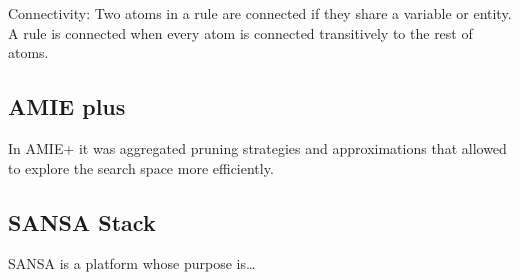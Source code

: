 \documentclass{article}
\begin{document}
Connectivity: Two atoms in a rule are connected if they share a variable or
entity. A rule is connected when every atom is connected transitively to the
rest of atoms. 

\subsection{AMIE plus}

In AMIE+ it was aggregated pruning strategies and approximations that allowed
to explore the search space more efficiently.

\subsection{SANSA Stack}

SANSA is a platform whose purpose is\ldots



\end{document}
